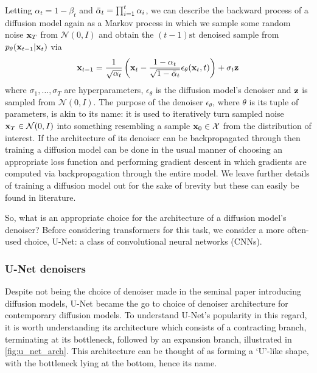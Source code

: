 \documentclass[11pt]{article}
\begin{document}
Letting $\alpha_t=1-\beta_t$ and $\Bar{\alpha}_t=\prod_{i=1}^t\alpha_i$, we can describe the backward process of a diffusion model again as a Markov process in which we sample some random noise $\mathbf{x}_T$ from $\mathcal{N}(0,I)$ and obtain the $(t-1){\text{st}}$ denoised sample from $p_{\theta}(\mathbf{x}_{t-1}|\mathbf{x}_t)$ via
$$
\mathbf{x}_{t-1}=\frac{1}{\sqrt{\alpha_t}}\left(\mathbf{x}_t-\frac{1-\alpha_t}{\sqrt
{1-\bar{\alpha}_t}}\epsilon_{\theta}(\mathbf{x}_t,t)\right)+\sigma_t\mathbf{z}
$$
where $\sigma_1,\dots,\sigma_T$ are hyperparameters, $\epsilon_{\theta}$ is the diffusion model's denoiser and $\mathbf{z}$ is sampled from $\mathcal{N}(0,I)$. %
The purpose of the denoiser $\epsilon_{\theta}$, where $\theta$ is its tuple of parameters, is akin to its name: it is used to iteratively turn sampled noise $\mathbf{x}_T\in\mathcal{N}(0,I)$ into something resembling a sample $\mathbf{x}_0\in\mathcal{X}$ from the distribution of interest. If the architecture of its denoiser can be backpropagated through then training a diffusion model can be done in the usual manner of choosing an appropriate loss function and performing gradient descent in which gradients are computed via backpropagation through the entire model. We leave further details of training a diffusion model out for the sake of brevity but these can easily be found in literature.

So, what is an appropriate choice for the architecture of a diffusion model's denoiser? Before considering transformers for this task, we consider a more often-used choice, U-Net: a class of convolutional neural networks (CNNs).

\subsubsection{U-Net denoisers}
Despite not being the choice of denoiser made in the seminal paper introducing diffusion models, U-Net became the go to choice of denoiser architecture for contemporary diffusion models. To understand U-Net's popularity in this regard, it is worth understanding its architecture which consists of a contracting branch, terminating at its bottleneck, followed by an expansion branch, illustrated in \autoref{fig:u_net_arch}. This architecture can be thought of as forming a `U'-like shape, with the bottleneck lying at the bottom, hence its name.
\end{document}

